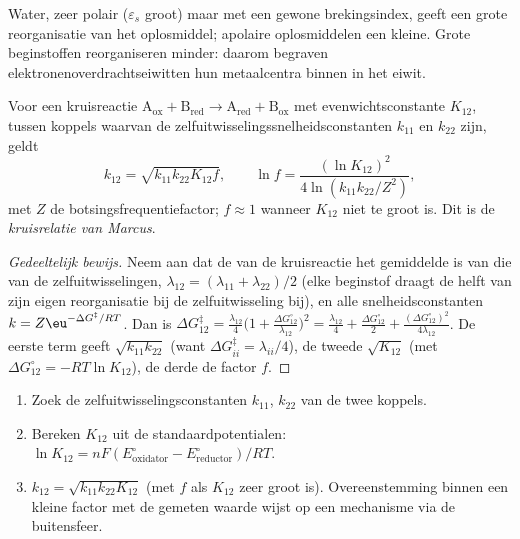 \admitted

Water, zeer polair ($\varepsilon_s$ groot) maar met een gewone brekingsindex, geeft een grote
reorganisatie van het oplosmiddel; apolaire oplosmiddelen een kleine.
Grote beginstoffen reorganiseren minder: daarom begraven
elektronenoverdrachtseiwitten hun metaalcentra binnen in het eiwit.

\begin{theorem}\label{thm:b3:complex-mechanisms:cross-relation}
Voor een kruisreactie $\mathrm{A_{ox} + B_{red} \to A_{red} + B_{ox}}$ met evenwichtsconstante $K_{12}$, tussen koppels
waarvan de zelfuitwisselingssnelheidsconstanten $k_{11}$ en $k_{22}$ zijn, geldt
\[
  k_{12} = \sqrt{k_{11}k_{22}K_{12}f}, \qquad \ln f = \frac{(\ln K_{12})^2}{4\ln(k_{11}k_{22}/Z^2)},
\]
met $Z$ de botsingsfrequentiefactor; $f \approx 1$ wanneer $K_{12}$ niet te groot is. Dit is de
\emph{kruisrelatie van Marcus}.
\end{theorem}

\begin{proof}[Gedeeltelijk bewijs]
Neem aan dat de  van de kruisreactie het gemiddelde
is van die van de
zelfuitwisselingen, $\lambda_{12} = (\lambda_{11} + \lambda_{22})/2$ (elke beginstof draagt de helft van zijn eigen
reorganisatie bij de zelfuitwisseling bij), en alle snelheidsconstanten $k = Z\eu^{-\Delta G^{\ddagger}/RT}$. Dan is
$\Delta G_{12}^{\ddagger} = \frac{\lambda_{12}}{4}\bigl(1 + \frac{\Delta G^\circ_{12}}{\lambda_{12}}\bigr)^2 = \frac{\lambda_{12}}{4} + \frac{\Delta G^\circ_{12}}{2} + \frac{(\Delta G^\circ_{12})^2}{4\lambda_{12}}$. De eerste term geeft
$\sqrt{k_{11}k_{22}}$ (want $\Delta G^{\ddagger}_{ii} = \lambda_{ii}/4$), de tweede $\sqrt{K_{12}}$ (met $\Delta G^\circ_{12} = -RT\ln K_{12}$), de derde
de factor $f$.
\end{proof}

\begin{method}\label{met:b3:complex-mechanisms:marcus-estimate}
\begin{enumerate}
  \item Zoek de zelfuitwisselingsconstanten $k_{11}$, $k_{22}$ van de twee koppels.
  \item Bereken $K_{12}$ uit de standaardpotentialen: $\ln K_{12} = nF(E^\circ_{\text{oxidator}} - E^\circ_{\text{reductor}})/RT$.
  \item $k_{12} = \sqrt{k_{11}k_{22}K_{12}}$ (met $f$ als $K_{12}$ zeer groot is). Overeenstemming binnen een
        kleine factor met de gemeten waarde wijst op een mechanisme via
        de buitensfeer.
\end{enumerate}
\end{method}

